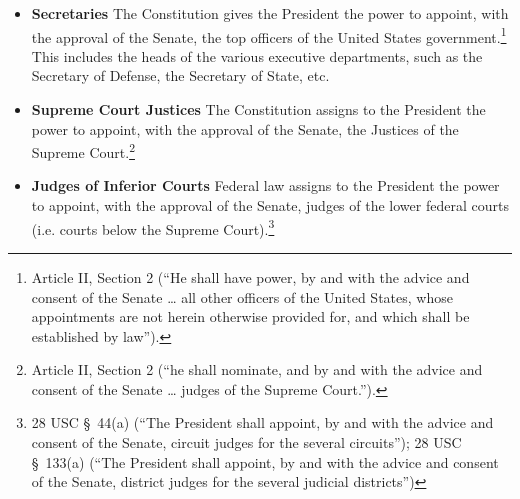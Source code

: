 \begin{itemize}

\item \textbf{Secretaries}
The Constitution gives the President the power to appoint, with the approval of the Senate, the top officers of the United States government.\footnote{Article II, Section 2 (``He shall have power, by and with the advice and consent of the Senate … all other officers of the United States, whose appointments are not herein otherwise provided for, and which shall be established by law'').}
This includes the heads of the various executive departments, such as the Secretary of Defense, the Secretary of State, etc.

\item \textbf{Supreme Court Justices}
The Constitution assigns to the President the power to appoint, with the approval of the Senate, the Justices of the Supreme Court.\footnote{Article II, Section 2 (``he shall nominate, and by and with the advice and consent of the Senate … judges of the Supreme Court.'').}

\item \textbf{Judges of Inferior Courts}
Federal law assigns to the President the power to appoint, with the approval of the Senate, judges of the lower federal courts (i.e. courts below the Supreme Court).\footnote{28 USC \S\ 44(a) (``The President shall appoint, by and with the advice and consent of the Senate, circuit judges for the several circuits''); 28 USC \S\ 133(a) (``The President shall appoint, by and with the advice and consent of the Senate, district judges for the several judicial districts'')}


\end{itemize}

